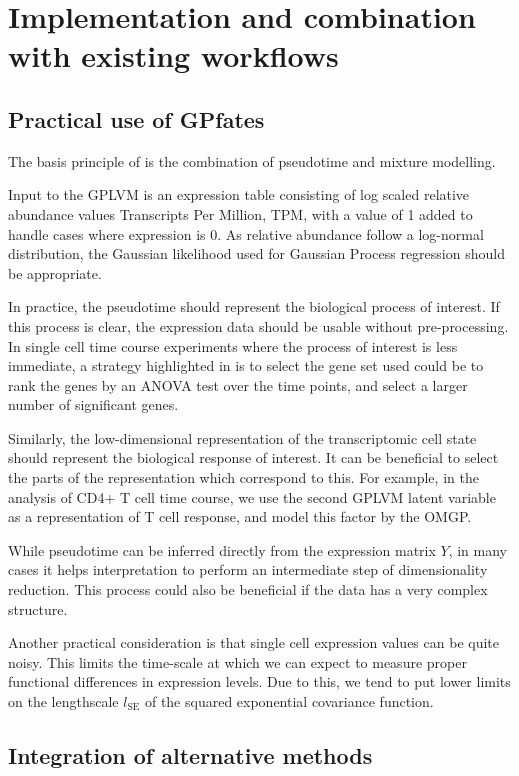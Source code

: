 \section{Implementation and combination with existing workflows}

\subsection{Practical use of GPfates}

The basis principle of  is the combination of pseudotime and mixture modelling.

Input to the GPLVM is an expression table consisting of log scaled relative abundance values Transcripts Per Million, TPM, with a value of 1 added to handle cases where expression is 0. As relative abundance follow a log-normal distribution, the Gaussian likelihood used for Gaussian Process regression should be appropriate.

In practice, the pseudotime should represent the biological process of interest. If this process is clear, the expression data should be usable without pre-processing. In single cell time course experiments where the process of interest is less immediate, a strategy highlighted in \cite{Trapnell2014-cn} is to select the gene set used could be to rank the genes by an ANOVA test over the time points, and select a larger number of significant genes.

Similarly, the low-dimensional representation of the transcriptomic cell state should represent the biological response of interest. It can be beneficial to select the parts of the representation which correspond to this. For example, in the analysis of CD4+ T cell time course, we use the second GPLVM latent variable as a representation of T cell response, and model this factor by the OMGP.

While pseudotime can be inferred directly from the expression matrix $ Y $, in many cases it helps interpretation to perform an intermediate step of dimensionality reduction. This process could also be beneficial if the data has a very complex structure.

Another practical consideration is that single cell expression values can be quite noisy. This limits the time-scale at which we can expect to measure proper functional differences in expression levels. Due to this, we tend to put lower limits on the lengthscale $ l_\text{SE} $ of the squared exponential covariance function.

\subsection{Integration of alternative methods}


